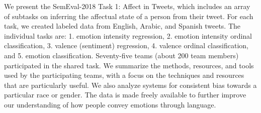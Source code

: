 We present the SemEval-2018 Task 1: Affect in Tweets, which includes an array of subtasks on inferring the affectual state of a person from their tweet. For each task, we created labeled data from English, Arabic, and Spanish tweets. The individual tasks are: 1. emotion intensity regression, 2. emotion intensity ordinal classification, 3. valence (sentiment) regression, 4. valence ordinal classification, and 5. emotion classification. Seventy-five teams (about 200 team members) participated in the shared task. We summarize the  methods, resources, and tools used by the participating teams, with a focus on the techniques and resources that are particularly useful. We also analyze systems for consistent bias towards a particular race or gender. The data is made freely available to further improve our understanding of how people convey emotions through language.
